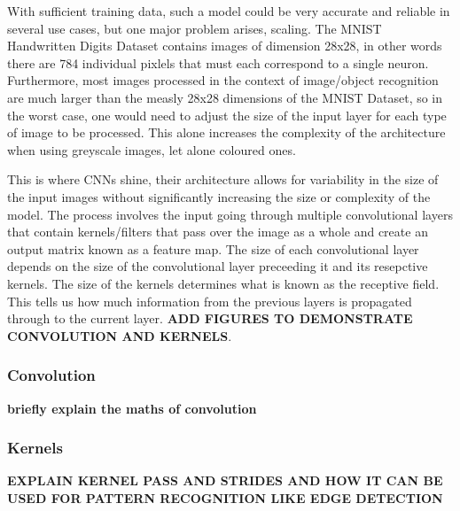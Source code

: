 With sufficient training data, such a model could be very accurate and reliable in several use cases, but one major problem arises, scaling. The MNIST Handwritten Digits Dataset contains images of dimension 28x28, in other words there are 784 individual pixlels that must each correspond to a single neuron. Furthermore, most images processed in the context of image/object recognition are much larger than the measly 28x28 dimensions of the MNIST Dataset, so in the worst case, one would need to adjust the size of the input layer for each type of image to be processed. This alone increases the complexity of the architecture when using greyscale images, let alone coloured ones.

This is where CNNs shine, their architecture allows for variability in the size of the input images without significantly increasing the size or complexity of the model. The process involves the input going through multiple convolutional layers that contain kernels/filters that pass over the image as a whole and create an output matrix known as a feature map. The size of each convolutional layer depends on the size of the convolutional layer preceeding it and its resepctive kernels. The size of the kernels determines what is known as the receptive field. This tells us how much information from the previous layers is propagated through to the current layer. \textbf{ADD FIGURES TO DEMONSTRATE CONVOLUTION AND KERNELS}.

\subsubsection{Convolution}
\textbf{briefly explain the maths of convolution}

\subsubsection{Kernels}
\textbf{EXPLAIN KERNEL PASS AND STRIDES AND HOW IT CAN BE USED FOR PATTERN RECOGNITION LIKE EDGE DETECTION}

